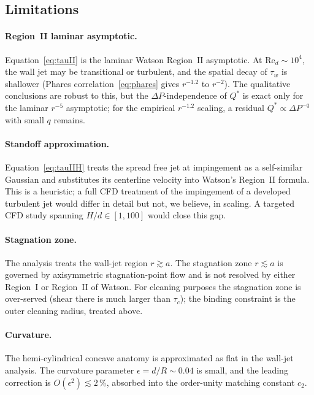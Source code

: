 \documentclass[aps,prfluids,reprint,amsmath,amssymb,floatfix]{revtex4-2}
\newcommand{\Rey}{\mathrm{Re}}
\begin{document}
\subsection{Limitations}

\paragraph{Region~II laminar asymptotic.}
Equation~\eqref{eq:tauII} is the laminar Watson Region~II asymptotic.
At $\Rey_d \sim 10^4$, the wall jet may be transitional or turbulent,
and the spatial decay of $\tau_w$ is shallower (Phares
correlation~\eqref{eq:phares} gives $r^{-1.2}$ to $r^{-2}$). The
qualitative conclusions are robust to this, but the $\Delta P$-independence
of $Q^*$ is exact only for the laminar $r^{-5}$ asymptotic; for the
empirical $r^{-1.2}$ scaling, a residual $Q^* \propto \Delta P^{-q}$
with small $q$ remains.

\paragraph{Standoff approximation.}
Equation~\eqref{eq:tauIIH} treats the spread free jet at impingement as
a self-similar Gaussian and substitutes its centerline velocity into
Watson's Region~II formula. This is a heuristic; a full CFD treatment
of the impingement of a developed turbulent jet would differ in detail
but not, we believe, in scaling. A targeted CFD study spanning $H/d
\in [1, 100]$ would close this gap.

\paragraph{Stagnation zone.}
The analysis treats the wall-jet region $r \gtrsim a$. The stagnation
zone $r \lesssim a$ is governed by axisymmetric stagnation-point flow
and is not resolved by either Region~I or Region~II of Watson. For
cleaning purposes the stagnation zone is over-served (shear there is
much larger than $\tau_c$); the binding constraint is the outer cleaning
radius, treated above.

\paragraph{Curvature.}
The hemi-cylindrical concave anatomy is approximated as flat in the
wall-jet analysis. The curvature parameter $\epsilon = d/R \sim 0.04$
is small, and the leading correction is $O(\epsilon^2) \lesssim 2$\,\%,
absorbed into the order-unity matching constant $c_2$.
\end{document}
